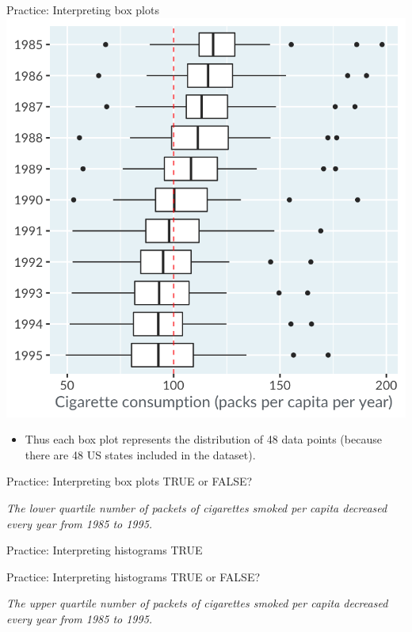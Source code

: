 \documentclass[
  ignorenonframetext,
]{beamer}
\providecommand{\tightlist}{%
  \setlength{\itemsep}{0pt}\setlength{\parskip}{0pt}}
\begin{document}
\begin{frame}{Practice: Interpreting box plots}
\label{practice-interpreting-box-plots-2}
\includegraphics{../images/im29.png}

\begin{itemize}
\tightlist
\item
  Thus each box plot represents the distribution of 48 data points
  (because there are 48 US states included in the dataset).
\end{itemize}
\end{frame}

\begin{frame}{Practice: Interpreting box plots}
\label{practice-interpreting-box-plots-3}
TRUE or FALSE?

\emph{The lower quartile number of packets of cigarettes smoked per
capita decreased every year from 1985 to 1995.}
\end{frame}

\begin{frame}{Practice: Interpreting histograms}
\label{practice-interpreting-histograms-13}
TRUE
\end{frame}

\begin{frame}{Practice: Interpreting histograms}
\label{practice-interpreting-histograms-14}
TRUE or FALSE?

\emph{The upper quartile number of packets of cigarettes smoked per
capita decreased every year from 1985 to 1995.}
\end{frame}
\end{document}
